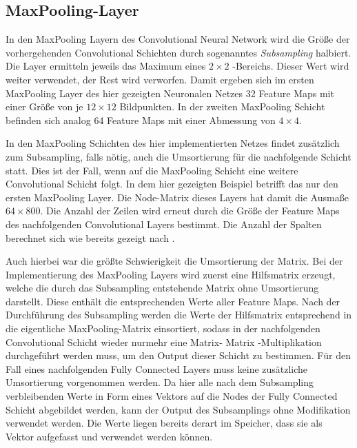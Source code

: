 \documentclass[../main.tex]{subfiles}
\begin{document}
\subsection{MaxPooling-Layer} \label{sec:cuda_pooling}
In den MaxPooling Layern des Convolutional Neural Network wird die Größe der vorhergehenden Convolutional Schichten durch sogenanntes \emph{Subsampling} halbiert. Die Layer ermitteln jeweils das Maximum eines $2\times2$ -Bereichs. Dieser Wert wird weiter verwendet, der Rest wird verworfen. Damit ergeben sich im ersten MaxPooling Layer des hier gezeigten Neuronalen Netzes 32 Feature Maps mit einer Größe von je $12\times12$ Bildpunkten. In der zweiten MaxPooling Schicht befinden sich analog 64 Feature Maps mit einer Abmessung von $4\times4$. \par In den MaxPooling Schichten des hier implementierten Netzes findet zusätzlich zum Subsampling, falls nötig, auch die Umsortierung für die nachfolgende Schicht statt. Dies ist der Fall, wenn auf die MaxPooling Schicht eine weitere Convolutional Schicht folgt. In dem hier gezeigten Beispiel betrifft das nur den ersten MaxPooling Layer. Die Node-Matrix dieses Layers hat damit die Ausmaße $64\times800$. Die Anzahl der Zeilen wird erneut durch die Größe der Feature Maps des nachfolgenden Convolutional Layers bestimmt. Die Anzahl der Spalten berechnet sich wie bereits gezeigt nach . \par Auch hierbei war die größte Schwierigkeit die Umsortierung der Matrix. Bei der Implementierung des MaxPooling Layers wird zuerst eine Hilfsmatrix erzeugt, welche die durch das Subsampling entstehende Matrix ohne Umsortierung darstellt. Diese enthält die entsprechenden Werte aller Feature Maps. Nach der Durchführung des Subsampling werden die Werte der Hilfsmatrix entsprechend in die eigentliche MaxPooling-Matrix einsortiert, sodass in der nachfolgenden Convolutional Schicht wieder nurmehr eine Matrix- Matrix -Multiplikation durchgeführt werden muss, um den Output dieser Schicht zu bestimmen. Für den Fall eines nachfolgenden Fully Connected Layers muss keine zusätzliche Umsortierung vorgenommen werden. Da hier alle nach dem Subsampling verbleibenden Werte in Form eines Vektors auf die Nodes der Fully Connected Schicht abgebildet werden, kann der Output des Subsamplings ohne Modifikation verwendet werden. Die Werte liegen bereits derart im Speicher, dass sie als Vektor aufgefasst und verwendet werden können. \par 
\end{document}
